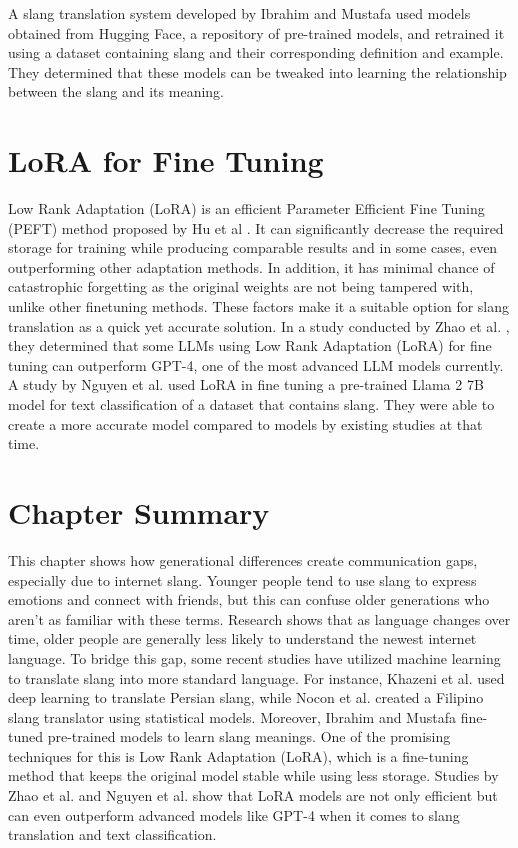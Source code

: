 A slang translation system developed by Ibrahim and Mustafa \cite{Abdulstar_Ibrahim_Shareef_Mustafa_2023} used models obtained from Hugging Face, a repository of pre-trained models, and retrained it using a dataset containing slang and their corresponding definition and example.
They determined that these models can be tweaked into learning the relationship between the slang and its meaning.

\section{LoRA for Fine Tuning}
Low Rank Adaptation (LoRA) is an efficient Parameter Efficient Fine Tuning (PEFT) method proposed by Hu et al \cite{hu2021loralowrankadaptationlarge}.
It can significantly decrease the required storage for training while producing comparable results and in some cases, even outperforming other adaptation methods.
In addition, it has minimal chance of catastrophic forgetting as the original weights are not being tampered with, unlike other finetuning methods.
These factors make it a suitable option for slang translation as a quick yet accurate solution.
In a study conducted by Zhao et al. \cite{zhao2024loraland310finetuned}, they determined that some LLMs using Low Rank Adaptation (LoRA) for fine tuning can outperform GPT-4, one of the most advanced LLM models currently.
A study by Nguyen et al. \cite{nguyen2023finetuningllama2large} used LoRA in fine tuning a pre-trained Llama 2 7B model for text classification of a dataset that contains slang.
They were able to create a more accurate model compared to models by existing studies at that time. 

\section{Chapter Summary}
This chapter shows how generational differences create communication gaps, especially due to internet slang.
Younger people tend to use slang to express emotions and connect with friends, but this can confuse older generations who aren't as familiar with these terms.
Research shows that as language changes over time, older people are generally less likely to understand the newest internet language.
To bridge this gap, some recent studies have utilized machine learning to translate slang into more standard language.
For instance, Khazeni et al. \cite{Khazeni} used deep learning to translate Persian slang, while Nocon et al. \cite{Nocon_Kho_Arroyo_2018} created a Filipino slang translator using statistical models.
Moreover, Ibrahim and Mustafa \cite{Abdulstar_Ibrahim_Shareef_Mustafa_2023} fine-tuned pre-trained models to learn slang meanings.
One of the promising techniques for this is Low Rank Adaptation (LoRA), which is a fine-tuning method that keeps the original model stable while using less storage.
Studies by Zhao et al. \cite{zhao2024loraland310finetuned} and Nguyen et al. \cite{nguyen2023finetuningllama2large} show that LoRA models are not only efficient but can even outperform advanced models like GPT-4 when it comes to slang translation and text classification. 
